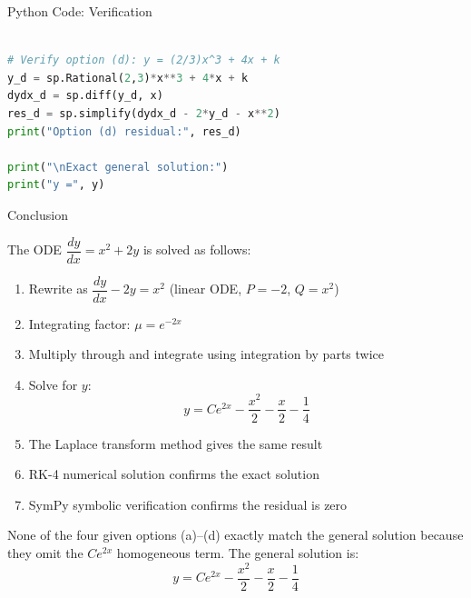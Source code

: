 \documentclass{beamer}
\numberwithin{equation}{section}
\theoremstyle{remark}
\begin{document}
\begin{frame}[fragile]{Python Code: Verification}

\lstset{basicstyle=\ttfamily\scriptsize}
\begin{lstlisting}[language=Python]

# Verify option (d): y = (2/3)x^3 + 4x + k
y_d = sp.Rational(2,3)*x**3 + 4*x + k
dydx_d = sp.diff(y_d, x)
res_d = sp.simplify(dydx_d - 2*y_d - x**2)
print("Option (d) residual:", res_d)

print("\nExact general solution:")
print("y =", y)
\end{lstlisting}

\end{frame}

\begin{frame}{Conclusion}

The ODE $\dfrac{dy}{dx} = x^2 + 2y$ is solved as follows:

\begin{enumerate}
  \item Rewrite as $\dfrac{dy}{dx} - 2y = x^2$ (linear ODE, $P=-2$, $Q=x^2$)
  \item Integrating factor: $\mu = e^{-2x}$
  \item Multiply through and integrate using integration by parts twice
  \item Solve for $y$:
        \[
          y = Ce^{2x} - \frac{x^2}{2} - \frac{x}{2} - \frac{1}{4}
        \]
  \item The Laplace transform method gives the same result
  \item RK-4 numerical solution confirms the exact solution
  \item SymPy symbolic verification confirms the residual is zero
\end{enumerate}

None of the four given options (a)--(d) exactly match the general solution
because they omit the $Ce^{2x}$ homogeneous term. The general solution is:
\[
  \boxed{y = Ce^{2x} - \frac{x^2}{2} - \frac{x}{2} - \frac{1}{4}}
\]

\end{frame}
\end{document}
